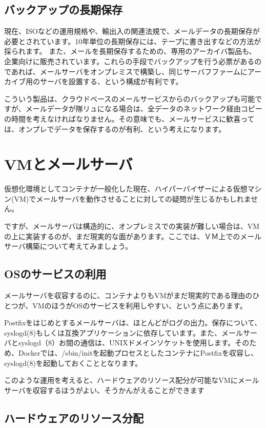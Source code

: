 \subsection{バックアップの長期保存}

現在、ISOなどの運用規格や、輸出入の関連法規で、メールデータの長期保存が必要とされています。10年単位の長期保存には、テープに書き出すなどの方法が採られます。
また、メールを長期保存するための、専用のアーカイバ製品も、企業向けに販売されています。これらの手段でバックアップを行う必票があるのであれば、メールサーバをオンプレミスで構築し、同じサーバフファームにアーカイブ用のサーバを設置する、という構成が有利です。

こういう製品は、クラウドベースのメールサービスからのバックアップも可能ですが、メールデータが隊リュになる場合は、全データのネットワーク経由コピーの時間を考えなければなりません。その意味でも、メールサービスに歓喜っては、オンプレでデータを保存するのが有利、という考えになります。

\section{VMとメールサーバ}

仮想化環境としてコンテナが一般化した現在、ハイパーバイザーによる仮想マシン(VM)でメールサーバを動作させることに対しての疑問が生じるかもしれません。

ですが、メールサーバは構造的に、オンプレミスでの実装が難しい場合は、VMの上に実装するのが、まだ現実的な面があります。ここでは、ＶＭ上でのメールサーバ構築について考えてみましょう。

\subsection{OSのサービスの利用}

メールサーバを収容するのに、コンテナよりもVMがまだ現実的である理由のひとつが、VMのほうがOSのサービスを利用しやすい、という点にあります。

Postfixをはじめとするメールサーバは、ほとんどがログの出力。保存について、syslogd(8)もしくは互換アプリケーションに依存しています。また、メールサーバとsyslogd（8）お間の通信は、UNIXドメインソケットを使用します。そのため、Dockerでは、/sbin/initを起動プロセスとしたコンテナにPostfixを収容し、syslogd(8)を起動しておくこととなります。

このような運用を考えると、ハードウェアのリソース配分が可能なVMにメールサーバを収容するほうがよい、そうかんがえることができます

\subsection{ハードウェアのリソース分配}

